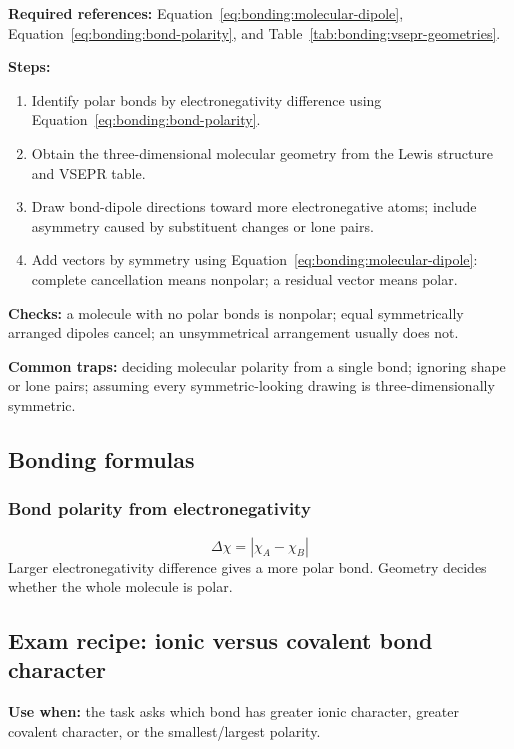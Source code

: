 \textbf{Required references:} Equation~\ref{eq:bonding:molecular-dipole}, Equation~\ref{eq:bonding:bond-polarity}, and Table~\ref{tab:bonding:vsepr-geometries}.

\textbf{Steps:}
\begin{enumerate}
    \item Identify polar bonds by electronegativity difference using Equation~\ref{eq:bonding:bond-polarity}.
    \item Obtain the three-dimensional molecular geometry from the Lewis structure and VSEPR table.
    \item Draw bond-dipole directions toward more electronegative atoms; include asymmetry caused by substituent changes or lone pairs.
    \item Add vectors by symmetry using Equation~\ref{eq:bonding:molecular-dipole}: complete cancellation means nonpolar; a residual vector means polar.
\end{enumerate}

\textbf{Checks:} a molecule with no polar bonds is nonpolar; equal symmetrically arranged dipoles cancel; an unsymmetrical arrangement usually does not.

\textbf{Common traps:} deciding molecular polarity from a single bond; ignoring shape or lone pairs; assuming every symmetric-looking drawing is three-dimensionally symmetric.

\subsection{Bonding formulas}

\subsubsection{Bond polarity from electronegativity}
\begin{equation}
\label{eq:bonding:bond-polarity}
\Delta\chi=|\chi_A-\chi_B|
\end{equation}
Larger electronegativity difference gives a more polar bond. Geometry decides whether the whole molecule is polar.

\subsection{Exam recipe: ionic versus covalent bond character}
\textbf{Use when:} the task asks which bond has greater ionic character, greater covalent character, or the smallest/largest polarity.

